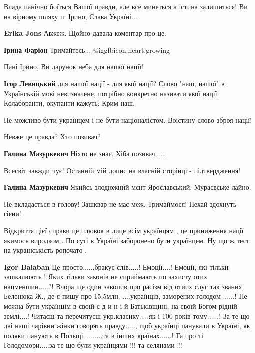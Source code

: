 \begin{itemize}
\begin{itemize}
\end{itemize} %


Влада панічно боїться Вашої правди, але все минеться а істина залишиться! Ви на
вірному шляху п. Ірино, Слава Україні...

\begin{itemize} %
\textbf{Erika Jons} Авжеж. Щойно давала коментар про це.

\textbf{Ірина Фаріон} Тримайтесь...  @igg{fbicon.heart.growing} 
\end{itemize} %

Пані Ірино, Ви дарунок неба для нашої нації!

\textbf{Ігор Левицький} для нашої нації - для якої нації? Слово "наш, нашої" в Українській мові невизначене, потрібно конкретно називати якої нації. Колаборанти, окупанти кажуть: Крим наш.

Не можливо бути українцем і не бути націоналістом. Воістину слово зброя нації!

Невже це правда? Хто позивач?

\begin{itemize} %
\textbf{Галина Мазуркевич} Ніхто не знає. Хіба позивач.....

Всесвіт завжди чує! Останній мій допис на власній сторінці - підтвердження!

\textbf{Галина Мазуркевич} Якийсь злодюжний мєнт Ярославський. Мураєвське лайно.

Не вкладається в голову! Зашквар не має меж. Тримаймося! Нехай здохнуть гієни!
\end{itemize} %


Відкриття цієї справи це плювок в лице всім українцям , це приниження нації
якимось виродком . По суті в Україні заборонено бути українцем. Ну що ж тест на
українськість ропочато .

\begin{itemize} %
\textbf{Igor Balaban}
Це просто......бракує
слів.....!
Емоції....!
Емоції, які тільки зашкалюють !
Яких тільки законів не сприймають по захисту отих нацменшин.....?!
Вчора ще один завопив про расізм
від отиих слуг так званих Беленюка Ж.,
де я пишу про 15,5млн. ....українців, заморених голодом
......!
Не можна бути українцім в своїй
є д и н і й Батьківщині, на своїй Богом рідній землі....!
Читаєш та перечитуєш укр.класику.....як і
100 років тому......!
За те що дві наші чарівни жінки говорять правду.....,
щоб українці панували в Україні,
як поляки панують в Польщі..........та в інших країнах......!
Та про ті Голодомори.....за те що були українцями !!! та селянами !!!


\end{itemize}
\end{itemize}
